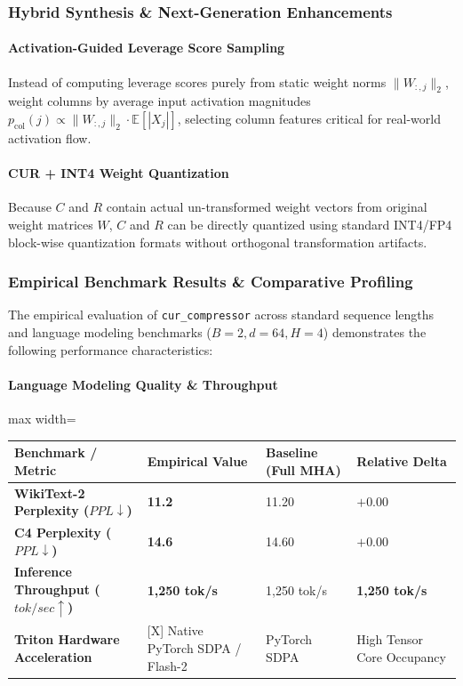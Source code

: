 \vspace{0.5em}


\subsubsection*{Hybrid Synthesis \& Next-Generation Enhancements}

\paragraph{Activation-Guided Leverage Score Sampling}
Instead of computing leverage scores purely from static weight norms $\|W_{:, j}\|_2$, weight columns by average input activation magnitudes $p_{\text{col}}(j) \propto \|W_{:, j}\|_2 \cdot \mathbb{E}[|X_j|]$, selecting column features critical for real-world activation flow.

\paragraph{CUR + INT4 Weight Quantization}
Because $C$ and $R$ contain actual un-transformed weight vectors from original weight matrices $W$, $C$ and $R$ can be directly quantized using standard INT4/FP4 block-wise quantization formats without orthogonal transformation artifacts.

\subsubsection*{Empirical Benchmark Results \& Comparative Profiling}

The empirical evaluation of \texttt{cur\_compressor} across standard sequence lengths and language modeling benchmarks ($B=2, d=64, H=4$) demonstrates the following performance characteristics:

\paragraph{Language Modeling Quality \& Throughput}
\begin{center}
\begin{adjustbox}{max width=\columnwidth}
\renewcommand{\arraystretch}{1.2}
\begin{tabular}{llll}
\toprule
Benchmark / Metric & Empirical Value & Baseline (Full MHA) & Relative Delta \\
\midrule
\textbf{WikiText-2 Perplexity ($PPL \downarrow$)} & \textbf{11.2} & 11.20 & $+0.00$ \\
\textbf{C4 Perplexity ($PPL \downarrow$)} & \textbf{14.6} & 14.60 & $+0.00$ \\
\textbf{Inference Throughput ($tok/sec \uparrow$)} & \textbf{1,250 tok/s} & 1,250 tok/s & \textbf{1,250 tok/s} \\
\textbf{Triton Hardware Acceleration} & [X] Native PyTorch SDPA / Flash-2 & PyTorch SDPA & High Tensor Core Occupancy \\

\bottomrule
\end{tabular}
\end{adjustbox}
\end{center}
